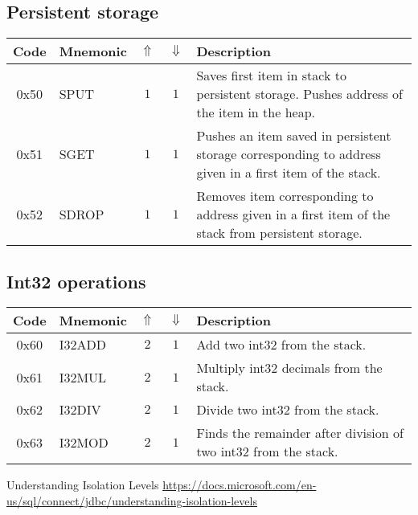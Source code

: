 \documentclass[12pt,a4paper]{article}
\begin{document}
\subsection{Persistent storage}
\begin{tabularx}{\textwidth}{ c l c c p{7cm} }
\textbf{Code} & \textbf{Mnemonic} & \textbf{$\Uparrow$} & \textbf{$\Downarrow$} & \textbf{Description} \\
\hline
0x50 & SPUT & $1$ & $1$ & Saves first item in stack to persistent storage. Pushes address of the item in the heap. \\
\hline
0x51 & SGET & $1$ & $1$ & Pushes an item saved in persistent storage corresponding to address given in a first item of the stack.  \\
0x52 & SDROP & $1$ & $1$ & Removes item corresponding to address given in a first item of the stack from persistent storage.  \\
\hline
\end{tabularx}

\subsection{Int32 operations}
\begin{tabularx}{\textwidth}{ c l c c p{7cm} }
\textbf{Code} & \textbf{Mnemonic} & \textbf{$\Uparrow$} & \textbf{$\Downarrow$} & \textbf{Description} \\
\hline
0x60 & I32ADD & $2$ & $1$ & Add two int32 from the stack. \\
\hline
0x61 & I32MUL & $2$ & $1$ & Multiply int32 decimals from the stack. \\
\hline
0x62 & I32DIV & $2$ & $1$ & Divide two int32 from the stack. \\
\hline
0x63 & I32MOD & $2$ & $1$ & Finds the remainder after division of two int32 from the stack. \\
\hline
\end{tabularx}

\begin{thebibliography}{9}

 Understanding Isolation Levels \url{https://docs.microsoft.com/en-us/sql/connect/jdbc/understanding-isolation-levels}
\end{thebibliography}
\end{document}
